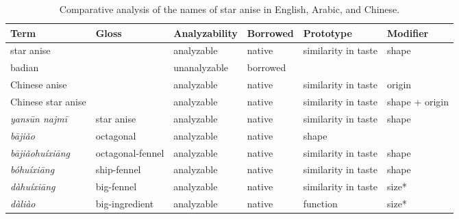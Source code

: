 \setlength{\tabcolsep}{3pt}

\begin{table}[!ht]
    \begin{tabularx}{\textwidth}{@{}llLlll@{}} %
    \toprule
    \textbf{Term} & \textbf{Gloss} & \textbf{Analyzability} & \textbf{Borrowed} & \textbf{Prototype} & \textbf{Modifier} \\ 
    \midrule
    star anise               &                   & analyzable  & native   & similarity in taste & shape  \\
    badian                   &                   & unanalyzable& borrowed &  &        \\
    Chinese anise            &                   & analyzable  & native   & similarity in taste & origin \\
    Chinese star anise       &                   & analyzable  & native   & similarity in taste & shape + origin \\
    \midrule
    \textit{yansūn najmī}    & star anise        & analyzable  & native   & similarity in taste & shape  \\
    \midrule
    \textit{bājiǎo}          & octagonal         & analyzable  & native   & shape &   \\
    \textit{bājiǎohuíxiāng}  & octagonal-fennel  & analyzable  & native   & similarity in taste & shape  \\ 
    \textit{bóhuíxiāng}      & ship-fennel       & analyzable  & native   & similarity in taste & shape  \\ 
    \textit{dàhuíxiāng}      & big-fennel        & analyzable  & native   & similarity in taste & size*  \\
    \textit{dàliào}          & big-ingredient    & analyzable  & native   & function & size*  \\
    \bottomrule
    \end{tabularx}
\caption{Comparative analysis of the names of star anise in English, Arabic, and Chinese.}
\label{table:analysis_star_anise}
\end{table}

\setlength{\tabcolsep}{6pt}

